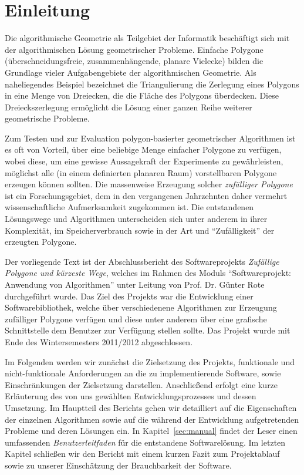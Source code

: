 \section{Einleitung}

  Die algorithmische Geometrie als Teilgebiet der Informatik beschäftigt sich
  mit der algorithmischen Lösung geometrischer Probleme. Einfache Polygone
  (überschneidungsfreie, zusammenhängende, planare Vielecke) bilden die
  Grundlage vieler Aufgabengebiete der algorithmischen Geometrie. Als
  naheliegendes Beispiel bezeichnet die Triangulierung die Zerlegung eines
  Polygons in eine Menge von Dreiecken, die die Fläche des Polygons
  überdecken. Diese Dreieckszerlegung ermöglicht die Lösung einer ganzen Reihe
  weiterer geometrische Probleme.

  Zum Testen und zur Evaluation polygon-basierter geometrischer
  Algorithmen ist es oft von Vorteil, über eine beliebige Menge einfacher
  Polygone zu verfügen, wobei diese, um eine gewisse Aussagekraft der
  Experimente zu gewährleisten, möglichst alle (in einem
  definierten planaren Raum) vorstellbaren Polygone erzeugen können sollten. Die
  massenweise Erzeugung solcher \emph{zufälliger Polygone} ist ein
  Forschungsgebiet, dem in den vergangenen Jahrzehnten daher vermehrt
  wissenschaftliche Aufmerksamkeit zugekommen ist. Die entstandenen
  Lösungswege und Algorithmen unterscheiden sich unter anderem in ihrer
  Komplexität, im Speicherverbrauch sowie in der Art und
  \enquote{Zufälligkeit} der erzeugten Polygone.

  Der vorliegende Text ist der Abschlussbericht des Softwareprojekts
  \emph{Zufällige Polygone und kürzeste Wege}, welches im Rahmen des Moduls
  \enquote{Softwareprojekt: Anwendung von Algorithmen} unter Leitung von Prof.
  Dr. Günter Rote durchgeführt wurde. Das Ziel des Projekts war die
  Entwicklung einer Softwarebibliothek, welche über verschiedenene Algorithmen
  zur Erzeugung zufälliger Polygone verfügen und diese unter anderem
  über eine grafische Schnittstelle dem Benutzer zur Verfügung stellen sollte.
  Das Projekt wurde mit Ende des Wintersemesters 2011/2012 abgeschlossen.

  Im Folgenden werden wir zunächst die Zielsetzung des Projekts, funktionale
  und nicht-funktionale Anforderungen an die zu implementierende Software,
  sowie Einschränkungen der Zielsetzung darstellen. Anschließend erfolgt eine
  kurze Erläuterung des von uns gewählten Entwicklungsprozesses und dessen
  Umsetzung. Im Hauptteil des Berichts gehen wir detailliert auf die
  Eigenschaften der einzelnen Algorithmen sowie auf die während der
  Entwicklung aufgetretenden Probleme und deren Lösungen ein. In
  Kapitel~\ref{sec:manual} findet der Leser einen umfassenden
  \emph{Benutzerleitfaden} für die entstandene Softwarelösung. Im letzten
  Kapitel schließen wir den Bericht mit einem kurzen Fazit zum Projektablauf
  sowie zu unserer Einschätzung der Brauchbarkeit der Software.
